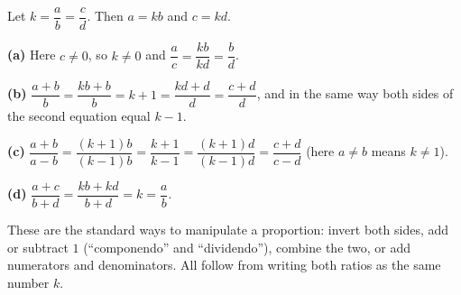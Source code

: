 Let $k=\dfrac {a}{b}=\dfrac {c}{d}$. Then $a=kb$ and $c=kd$.

\textbf{(a)} Here $c\ne0$, so $k\ne0$ and $\dfrac {a}{c}=\dfrac{kb}{kd}=\dfrac {b}{d}$.

\textbf{(b)} $\dfrac{a+b}{b}=\dfrac{kb+b}{b}=k+1=\dfrac{kd+d}{d}=\dfrac{c+d}{d}$, and in the same way both sides of the second equation equal $k-1$.

\textbf{(c)} $\dfrac{a+b}{a-b}=\dfrac{(k+1)b}{(k-1)b}=\dfrac{k+1}{k-1}=\dfrac{(k+1)d}{(k-1)d}=\dfrac{c+d}{c-d}$ (here $a\ne b$ means $k\ne1$).

\textbf{(d)} $\dfrac{a+c}{b+d}=\dfrac{kb+kd}{b+d}=k=\dfrac {a}{b}$.

These are the standard ways to manipulate a proportion: invert both sides, add or subtract $1$ (``componendo'' and ``dividendo''), combine the two, or add numerators and denominators. All follow from writing both ratios as the same number $k$.
